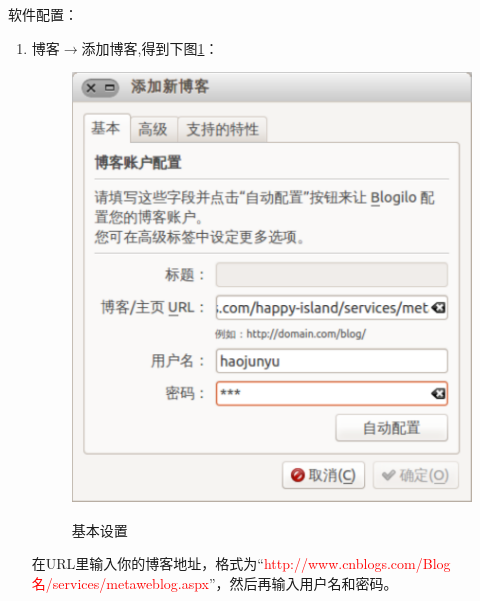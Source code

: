 软件配置：
\begin{enumerate}
\item 博客$\rightarrow{}$添加博客,得到下图\ref{fig:blogilo_base}：
\begin{figure}[!htbp]
	\centering
	\caption{基本设置}  
		\includegraphics[scale=0.25]{figs/ubuntu_blogilo_base.pdf}
    	\label{fig:blogilo_base}
\end{figure}
在URL里输入你的博客地址，格式为“\textcolor{red}{http://www.cnblogs.com/Blog名/services/metaweblog.aspx}”，然后再输入用户名和密码。


\end{enumerate}
